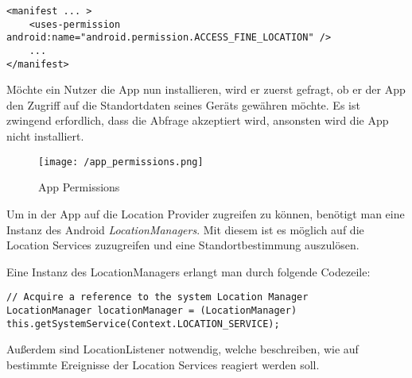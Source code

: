 \begin{lstlisting}[caption={App Permissions},label=lst:locationPermission]
<manifest ... >
    <uses-permission android:name="android.permission.ACCESS_FINE_LOCATION" />
    ...
</manifest>
\end{lstlisting}

Möchte ein Nutzer die App nun installieren, wird er zuerst gefragt, ob er der App den Zugriff auf die Standortdaten seines Geräts gewähren möchte. Es ist zwingend erfordlich, dass die Abfrage akzeptiert wird, ansonsten wird die App nicht installiert.

\begin{figure}[H]
	\centering
	\texttt{[image: /app\_permissions.png]}
	\caption[Lokalisierung: App Permissions]{App Permissions}
	\label{fig:appPermissions}
\end{figure}

Um in der App auf die Location Provider zugreifen zu können, benötigt man eine Instanz des Android \textit{LocationManagers}. Mit diesem ist es möglich auf die Location Services zuzugreifen und eine Standortbestimmung auszulösen.

Eine Instanz des LocationManagers erlangt man durch folgende Codezeile:

\begin{lstlisting}[caption={LocationManager Instanz},label=lst:locationManagerInstance, basicstyle=\footnotesize]
// Acquire a reference to the system Location Manager
LocationManager locationManager = (LocationManager) this.getSystemService(Context.LOCATION_SERVICE);
\end{lstlisting}

Außerdem sind LocationListener notwendig, welche beschreiben, wie auf bestimmte Ereignisse der Location Services reagiert werden soll.

